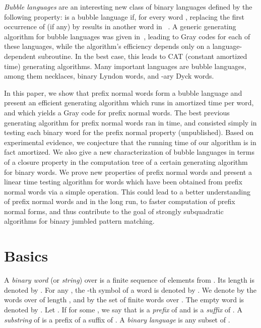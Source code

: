 \documentclass[11pt,a4paper]{llncs}
\begin{document}
{\em Bubble languages} are an interesting new class of binary languages defined by the following property:  is a bubble language if, for every word , replacing the first occurrence of  (if any)  by  results in another word in ~\cite{RSW12,Ruskey12,SW12}. A generic generating algorithm for bubble languages was given in~\cite{SW12}, leading to Gray codes for each of these languages, while the algorithm's efficiency depends only on a language-dependent subroutine. In the best case, this leads to CAT (constant amortized time) generating algorithms. Many important languages are bubble languages, among them necklaces, binary Lyndon words, and -ary Dyck words. 




In this paper, we show that prefix normal words form a bubble language and present an efficient generating algorithm which runs in  amortized time per word, and which yields a Gray code for prefix normal words. The best previous generating algorithm for prefix normal words ran in  time, and consisted simply in testing each binary word for the prefix normal property (unpublished). Based on experimental evidence, we conjecture that the running time of our algorithm is in fact   amortized. We also give a new characterization of bubble languages in terms of a closure property in the computation tree of a certain generating algorithm for binary words. 
We prove new properties of prefix normal words and present a linear time testing algorithm for words which have been obtained from prefix normal words via a simple operation. This could lead to a better understanding of prefix normal words and in the long run, to faster  computation of prefix normal forms, and thus contribute to the goal of strongly subquadratic algorithms for binary jumbled pattern matching.



\section{Basics}


A {\em binary word} (or {\em string})  over  is a finite sequence of elements from . Its length  is denoted by . For any , the -th symbol of a word  is denoted by . 
We denote by  the words over  of length , and by  the set of finite words  over . The empty word is denoted by . 
Let . If  for some , we say that  is a \emph{prefix} of  and  is a \emph{suffix} of . A \emph{substring} of  is a prefix of a suffix of . A {\em binary language} is any subset  of .
\end{document}
